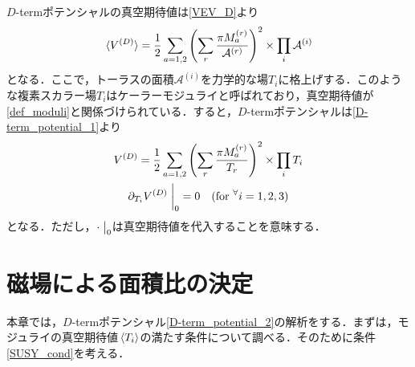 \documentclass[a4paper,uplatex,dvipdfmx,10pt]{jsarticle}
\theoremstyle{definition}
\begin{document}
$D$-termポテンシャルの真空期待値は\eqref{VEV_D}より
\begin{equation}
   \ev*{V^{(D)}}
   =
   \frac{1}{2}\sum_{a=1,2}
   \left(  
      \sum_{r}\frac{\pi M_{a}^{(r)}}{\mathcal{A}^{(r)}}
   \right)^2
   \times
   \prod_{i}\mathcal{A}^{(i)}
   \label{D-term_potential_1}
\end{equation}
となる．ここで，トーラスの面積$\mathcal{A}^{(i)}$を力学的な場$T_{i}$に格上げする．このような複素スカラー場$T_{i}$はケーラーモジュライと呼ばれており，真空期待値が\eqref{def_moduli}と関係づけられている．すると，$D$-termポテンシャルは\eqref{D-term_potential_1}より
\begin{gather}
   V^{(D)}
   =
   \frac{1}{2}
   \sum_{a=1,2}
   \left(  
      \sum_{r}\frac{\pi M_{a}^{(r)}}{T_{r}}
   \right)^2
   \times
   \prod_{i}T_{i}
   \label{D-term_potential_2}
   \\
   \partial_{T_{i}}V^{(D)}
   \left.\vphantom{\frac{1}{2}}\right|_{0}
   =
   0
   \quad
   (\text{for}\ ^{\forall}i=1,2,3)
   \label{SUSY_cond}
\end{gather}
となる．ただし，$\cdot\left.\vphantom{\frac{1}{2}}\right|_{0}$は真空期待値を代入することを意味する．


\section{磁場による面積比の決定}
\label{D-term_potential_analysis}

本章では，$D$-termポテンシャル\eqref{D-term_potential_2}の解析をする．まずは，モジュライの真空期待値$\ev*{T_{i}}$の満たす条件について調べる．そのために条件\eqref{SUSY_cond}を考える．
\end{document}
